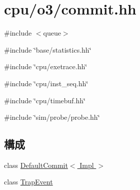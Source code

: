 \hypertarget{commit_8hh}{
\section{cpu/o3/commit.hh}
\label{commit_8hh}
}
{\ttfamily \#include $<$queue$>$}\par
{\ttfamily \#include \char`\"{}base/statistics.hh\char`\"{}}\par
{\ttfamily \#include \char`\"{}cpu/exetrace.hh\char`\"{}}\par
{\ttfamily \#include \char`\"{}cpu/inst\_\-seq.hh\char`\"{}}\par
{\ttfamily \#include \char`\"{}cpu/timebuf.hh\char`\"{}}\par
{\ttfamily \#include \char`\"{}sim/probe/probe.hh\char`\"{}}\par
\subsection*{構成}
\begin{DoxyCompactItemize}
\item 
class \hyperlink{classDefaultCommit}{DefaultCommit$<$ Impl $>$}
\item 
class \hyperlink{classDefaultCommit_1_1TrapEvent}{TrapEvent}
\end{DoxyCompactItemize}
